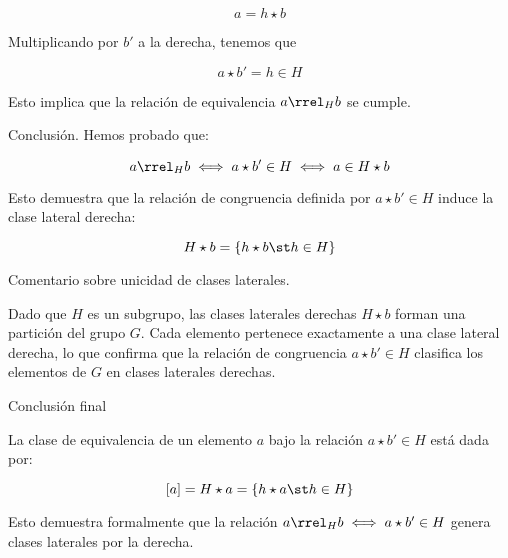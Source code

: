 $$ a = h \star b $$

Multiplicando por $b'$ a la derecha, tenemos que

$$ a \star b' = h \in H $$

\noindent Esto implica que la relación de equivalencia $a \rrel_H b$ se
cumple.

Conclusión. Hemos probado que:

$$ a \rrel_H b \iff a \star b' \in H \iff a \in H \star b $$

Esto demuestra que la relación de congruencia definida por $a \star b' \in
H$ induce la clase lateral derecha:

$$ H \star b = \{ h \star b \st h \in H \} $$

Comentario sobre unicidad de clases laterales.

Dado que $H$ es un subgrupo, las clases laterales derechas $H \star b$
forman una partición del grupo $G$. Cada elemento pertenece exactamente a
una clase lateral derecha, lo que confirma que la relación de congruencia $a
\star b' \in H$ clasifica los elementos de $G$ en clases laterales derechas.

Conclusión final

La clase de equivalencia de un elemento $a$ bajo la relación $a \star b' \in
H$ está dada por:

$$ [a] = H \star a = \{ h \star a \st h \in H \} $$

Esto demuestra formalmente que la relación $a \rrel_H b \iff a \star b' \in
H$ genera clases laterales por la derecha.






\iffalse
Por un lado,
tenemos que

Sea $a \in G$,
se tiene que la clase de equivalencia del elemento $a$ por $\rrel_H$ es

$$ [a] = a \star H = \{a \star h \st h \in H\} $$


En efecto, si $b \in [a]$, entonces el elemento $h = b \star a'$ pertenecerá
a $H$. De esto se deduce que $b = h \star a = a \star h$. Recíprocamente, si
$b = a \star h$ con $h \in H$, entonces $b \star a' = h \in H$. 

\fi

